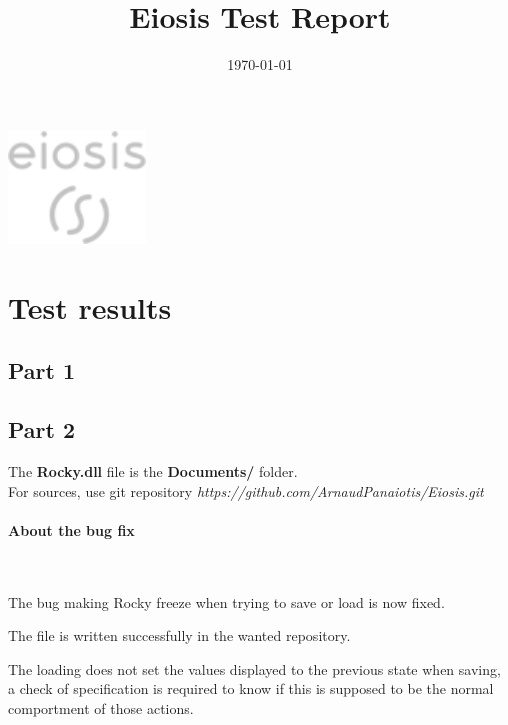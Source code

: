 \documentclass[10pt, a4paper]{article}
\title{Eiosis Test Report}
\date{\today}
\author{\arno}
\begin{document}
\maketitle
\bigskip

\vfill
\begin{center}
	\includegraphics[height=3cm]{images/eiosis-logo.png}
\end{center}


\newpage
\tableofcontents




\newpage

\newpage
\section{Test results}

\subsection{Part 1}



\newpage
\subsection{Part 2}

The \textbf{Rocky.dll} file is the \textbf{Documents/} folder.\\
For sources, use git repository \textit{https://github.com/ArnaudPanaiotis/Eiosis.git}

\paragraph*{About the bug fix}
~

\bigskip
The bug making Rocky freeze when trying to save or load is now fixed.
\bigskip

The file is written successfully in the wanted repository.
\bigskip

The loading does not set the values displayed to the previous state when saving, a check of specification is required to know if this is supposed to be the normal comportment of those actions.
\end{document}
